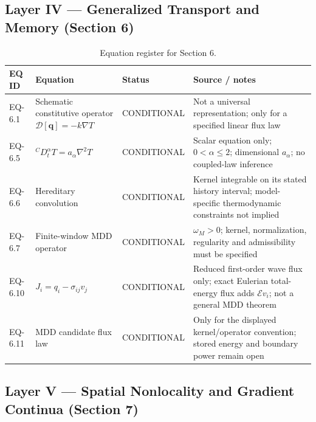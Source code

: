 \subsection{Layer IV — Generalized Transport and Memory (Section 6)}

\begin{table}[htbp]
\centering
\small
\caption{Equation register for Section 6.}
\label{tab:appA-sec6}
\begin{tabularx}{\textwidth}{@{}p{1.6cm}Y p{2.8cm}Y@{}}
\toprule
\textbf{EQ ID} & \textbf{Equation} & \textbf{Status} & \textbf{Source / notes} \\
\midrule
EQ-6.1 & Schematic constitutive operator $\mathcal{D}[\bm q]=-k\nabla T$ & CONDITIONAL & Not a universal representation; only for a specified linear flux law \\
EQ-6.5 & ${}^C D_t^\alpha T=a_\alpha\nabla^2T$ & CONDITIONAL & Scalar equation only; $0<\alpha\leq2$; dimensional $a_\alpha$; no coupled-law inference \\
EQ-6.6 & Hereditary convolution & CONDITIONAL & Kernel integrable on its stated history interval; model-specific thermodynamic constraints not implied \\
EQ-6.7 & Finite-window MDD operator & CONDITIONAL & $\omega_M>0$; kernel, normalization, regularity and admissibility must be specified \\
EQ-6.10 & $J_i=q_i-\sigma_{ij}v_j$ & CONDITIONAL & Reduced first-order wave flux only; exact Eulerian total-energy flux adds $\mathcal{E}v_i$; not a general MDD theorem \\
EQ-6.11 & MDD candidate flux law & CONDITIONAL & Only for the displayed kernel/operator convention; stored energy and boundary power remain open \\
\bottomrule
\end{tabularx}
\end{table}

\subsection{Layer V — Spatial Nonlocality and Gradient Continua (Section 7)}

